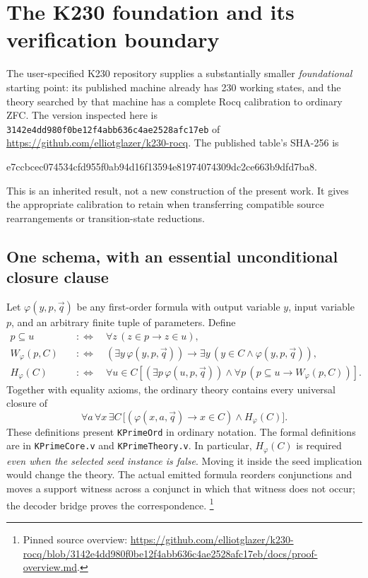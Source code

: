 \section{The K230 foundation and its verification boundary}
\label{sec:k230-foundation}

The user-specified K230 repository supplies a substantially smaller
\emph{foundational} starting point: its published machine already has
230 working states, and the theory searched by that machine has a complete
Rocq calibration to ordinary ZFC.  The version inspected here is
\texttt{3142e4dd980f0be12f4abb636c4ae2528afc17eb} of
\url{https://github.com/elliotglazer/k230-rocq}.
The published table's SHA-256 is
\begin{center}\scriptsize\ttfamily
e7ccbcec074534cfd955f0ab94d16f13594e81974074309dc2ce663b9dfd7ba8.
\end{center}
This is an inherited result, not a new construction of the present work.
It gives the appropriate calibration to retain when transferring
compatible source rearrangements or transition-state reductions.

\subsection{One schema, with an essential unconditional closure clause}

Let $\varphi(y,p,\vec q)$ be any first-order formula with output variable
$y$, input variable $p$, and an arbitrary finite tuple of parameters.
Define
\begin{align*}
 p\subseteq u&\quad:\!\!\Longleftrightarrow\quad
       \forall z\,(z\in p\longrightarrow z\in u),\\
 W_\varphi(p,C)&\quad:\!\!\Longleftrightarrow\quad
       (\exists y\,\varphi(y,p,\vec q))
       \longrightarrow\exists y\,(y\in C\land\varphi(y,p,\vec q)),\\
 H_\varphi(C)&\quad:\!\!\Longleftrightarrow\quad
       \forall u\in C\left[
       (\exists p\,\varphi(u,p,\vec q))\land
       \forall p\,(p\subseteq u\longrightarrow W_\varphi(p,C))\right].
\end{align*}
Together with equality axioms, the ordinary theory contains every
universal closure of
\begin{equation}
 \forall a\,\forall x\,\exists C\,
 \bigl[(\varphi(x,a,\vec q)\longrightarrow x\in C)
          \land H_\varphi(C)\bigr].
 \label{eq:k230-ordinary-schema}
\end{equation}
These definitions present \texttt{KPrimeOrd} in ordinary notation.
The formal definitions are in \texttt{KPrimeCore.v} and
\texttt{KPrimeTheory.v}.  In particular, $H_\varphi(C)$ is required
\emph{even when the selected seed instance is false}.  Moving it
inside the seed implication would change the theory.  The actual emitted
formula reorders conjunctions and moves a support witness across a
conjunct in which that witness does not occur; the decoder bridge proves
the correspondence.
\footnote{Pinned source overview:
\url{https://github.com/elliotglazer/k230-rocq/blob/3142e4dd980f0be12f4abb636c4ae2528afc17eb/docs/proof-overview.md}.}

